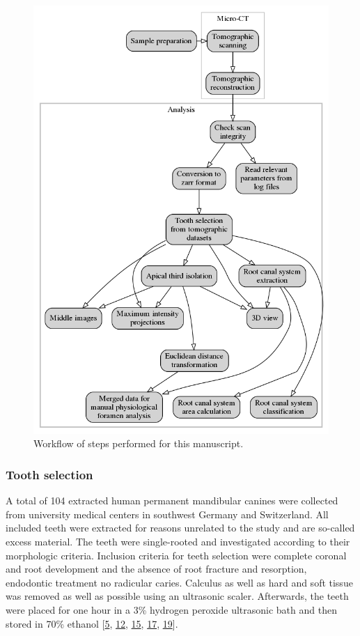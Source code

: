 \documentclass[
  american,
]{article}
\begin{document}
\begin{figure}
\hypertarget{fig:workflow}{%
\centering
\includegraphics{images/workflow.png}
\caption{Workflow of steps performed for this manuscript.}\label{fig:workflow}
}
\end{figure}

\hypertarget{tooth-selection}{%
\subsubsection{Tooth selection}\label{tooth-selection}}

A total of 104 extracted human permanent mandibular canines were collected from university medical centers in southwest Germany and Switzerland.
All included teeth were extracted for reasons unrelated to the study and are so-called excess material.
The teeth were single-rooted and investigated according to their morphologic criteria.
Inclusion criteria for teeth selection were complete coronal and root development and the absence of root fracture and resorption, endodontic treatment no radicular caries.
Calculus as well as hard and soft tissue was removed as well as possible using an ultrasonic scaler.
Afterwards, the teeth were placed for one hour in a 3\% hydrogen peroxide ultrasonic bath and then stored in 70\% ethanol {[}\protect\hyperlink{ref-1HkTk4VKM}{5}, \protect\hyperlink{ref-OttTicsv}{12}, \protect\hyperlink{ref-amSKhLb1}{15}, \protect\hyperlink{ref-ZTgDEakx}{17}, \protect\hyperlink{ref-1Gn1pVZXt}{19}{]}.
\end{document}
